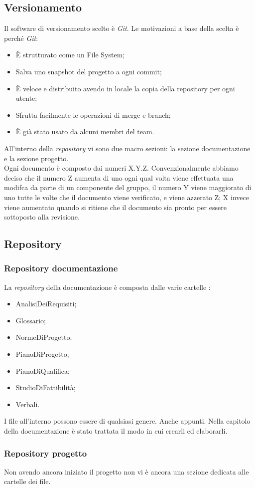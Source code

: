 \documentclass[12pt,a4paper,titlepage]{article}
\begin{document}
\subsection{Versionamento}
Il software di versionamento scelto è \textit{Git}. Le motivazioni a base della scelta è perché \textit{Git}:
\begin{itemize}
	\item È strutturato come un File System;
	\item Salva uno snapshot del progetto a ogni commit;
	\item È veloce e distribuito avendo in locale la copia della repository per ogni utente;
	\item Sfrutta facilmente le operazioni di merge e branch;
	\item È già stato usato da alcuni membri del team.
\end{itemize}
All'interno della \textit{repository} vi sono due macro sezioni: la sezione documentazione e la sezione progetto.\\
Ogni documento è composto dai numeri X.Y.Z. Convenzionalmente abbiamo deciso che il numero Z aumenta di uno ogni qual volta viene effettuata una modifca da parte di un componente del gruppo, il numero Y viene maggiorato di uno tutte le volte che il documento viene verificato, e viene azzerato Z; X invece viene aumentato quando si ritiene che il documento sia pronto per essere sottoposto alla revisione.
\newpage
\subsection{Repository}
\subsubsection{Repository documentazione}
La \textit{repository} della documentazione è composta dalle varie cartelle :
\begin{itemize}
	\item AnalisiDeiRequisiti;
	\item Glossario;
	\item NormeDiProgetto;
	\item PianoDiProgetto;
	\item PianoDiQualifica;
	\item StudioDiFattibilità;
	\item Verbali.
\end{itemize}
I file all'interno possono essere di qualsiasi genere. Anche appunti. Nella capitolo della documentazione è stato trattata il modo in cui crearli ed elaborarli.
\subsubsection{Repository progetto}
Non avendo ancora iniziato il progetto non vi è ancora una sezione dedicata alle cartelle dei file.\\
\end{document}
